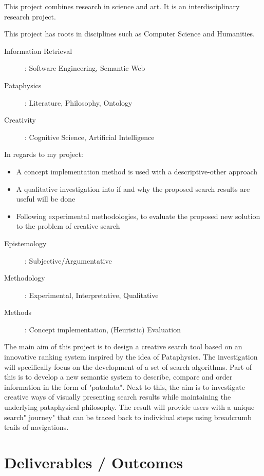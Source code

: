 This project combines research in science and art. It is an interdisciplinary research project.

This project has roots in disciplines such as Computer Science and Humanities.
\begin{description}
  \item [Information Retrieval]: Software Engineering, Semantic Web
  \item [Pataphysics]: Literature, Philosophy, Ontology
  \item [Creativity]: Cognitive Science, Artificial Intelligence
\end{description}

In regards to my project:
\begin{itemize}
  \item A concept implementation method is used with a descriptive-other approach
  \item A qualitative investigation into if and why the proposed search results are useful will be done
  \item Following experimental methodologies, to evaluate the proposed new solution to the problem of creative search
\end{itemize}

\begin{description}
  \item [Epistemology]: Subjective/Argumentative
  \item [Methodology]: Experimental, Interpretative, Qualitative
  \item [Methods]: Concept implementation, (Heuristic) Evaluation
\end{description}

The main aim of this project is to design a creative search tool based on an innovative ranking system inspired by the idea of Pataphysics. The investigation will specifically focus on the development of a set of search algorithms. Part of this is to develop a new semantic system to describe, compare and order information in the form of "patadata". Next to this, the aim is to investigate creative ways of visually presenting search results while maintaining the underlying pataphysical philosophy. The result will provide users with a unique search" journey" that can be traced back to individual steps using breadcrumb trails of navigations.

\section{Deliverables / Outcomes}

